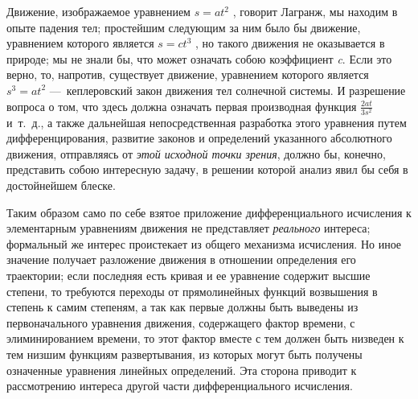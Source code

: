 Движение, изображаемое уравнением  $s=at^2$ , говорит Лагранж, мы находим в
опыте падения тел; простейшим следующим за ним было бы движение, уравнением
которого является  $s=ct^3$ , но такого движения не оказывается в природе;
мы не знали бы, что может означать собою коэффициент
{\em c}. Если это верно, то, напротив, существует
движение, уравнением которого является  $s^3=at^2$  —~кеплеровский закон
движения тел солнечной системы. И разрешение вопроса о том, что здесь
должна означать первая производная функция  $\frac{2\mathit{at}}{3s^2}$ 
и~т.~д., а также дальнейшая непосредственная разработка этого уравнения
путем дифференцирования, развитие законов и определений указанного
абсолютного движения, отправляясь от {\em этой исходной
точки зрения}, должно бы, конечно, представить собою интересную задачу, в
решении которой анализ явил бы себя в достойнейшем блеске.

Таким образом само по себе взятое приложение дифференциального исчисления к
элементарным уравнениям движения не представляет
{\em реального} интереса; формальный же интерес
проистекает из общего механизма исчисления. Но иное значение получает
разложение движения в отношении определения его траектории; если последняя
есть кривая и ее уравнение содержит высшие степени, то требуются переходы
от прямолинейных функций возвышения в степень к самим степеням, а так как
первые должны быть выведены из первоначального уравнения движения,
содержащего фактор времени, с элиминированием времени, то этот фактор
вместе с тем должен быть низведен к тем низшим функциям развертывания, из
которых могут быть получены означенные уравнения линейных определений. Эта
сторона приводит к рассмотрению интереса другой части дифференциального
исчисления.

